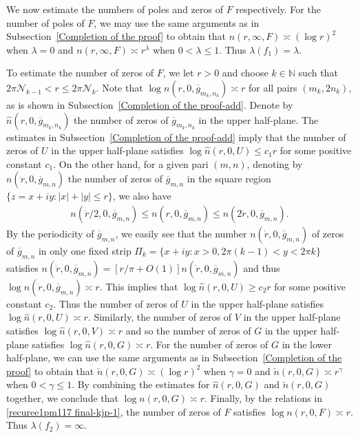 \documentclass[12pt]{amsart}
\numberwithin{equation}{section}
\begin{document}
We now estimate the numbers of poles and zeros of $F$ respectively. For the number of poles of $F$, we may use the same arguments as in Subsection~\ref{Completion of the proof} to obtain that $n(r,\infty,F)\asymp (\log r)^2$ when $\lambda=0$ and $n(r,\infty,F)\asymp r^{\lambda}$ when $0<\lambda\leq 1$. Thus $\lambda(f_1)=\lambda$.

To estimate the number of zeros of $F$, we let $r>0$ and choose $k\in \mathbb{N}$ such that $2\pi\mathcal{N}_{k-1}<r\leq 2\pi \mathcal{N}_k$. Note that $\log n(r,0,\overline{g}_{m_k,n_k})\asymp r$ for all pairs $(m_k,2n_k)$, as is shown in Subsection~\ref{Completion of the proof-add}. Denote by $\hat{n}(r,0,\overline{g}_{m_k,n_k})$ the number of zeros of $\overline{g}_{m_k,n_k}$ in the upper half-plane. The estimates in Subsection~\ref{Completion of the proof-add} imply that the number of zeros of $U$ in the upper half-plane satisfies $\log \hat{n}(r,0,U)\leq c_1r$ for some positive constant $c_1$. On the other hand, for a given pari $(m,n)$, denoting by $n(\ddot{r},0,\overline{g}_{m,n})$ the number of zeros of $\overline{g}_{m,n}$ in the square region $\{z=x+iy:|x|+|y|\leq r\}$, we also have
\begin{equation*}
\begin{split}
n(\ddot{r}/2,0,\overline{g}_{m,n})\leq n(r,0,\overline{g}_{m,n})\leq n(2\ddot{r},0,\overline{g}_{m,n}).
\end{split}
\end{equation*}
By the periodicity of $\overline{g}_{m,n}$, we easily see that the number $n(\dot{r},0,\overline{g}_{m,n})$ of zeros of $\overline{g}_{m,n}$ in only one fixed strip $\Pi_k=\{x+iy: x>0, 2\pi(k-1)<y<2\pi k\}$ satisfies $n(\ddot{r},0,\overline{g}_{m,n})=[r/\pi+O(1)]n(\dot{r},0,\overline{g}_{m,n})$ and thus $\log n(\dot{r},0,\overline{g}_{m,n})\asymp r$. This implies that $\log \hat{n}(r,0,U)\geq c_2r$ for some positive constant $c_2$. Thus the number of zeros of $U$ in the upper half-plane satisfies $\log\hat{n}(r,0,U)\asymp r$. Similarly, the number of zeros of $V$ in the upper half-plane satisfies $\log\hat{n}(r,0,V)\asymp r$ and so the number of zeros of $G$ in the upper half-plane satisfies $\log\hat{n}(r,0,G)\asymp r$. For the number of zeros of $G$ in the lower half-plane, we can use the same arguments as in Subsection~\ref{Completion of the proof} to obtain that $\check{n}(r,0,G)\asymp (\log r)^2$ when $\gamma=0$ and $\check{n}(r,0,G)\asymp r^{\gamma}$ when $0<\gamma\leq 1$. By combining the estimates for $\hat{n}(r,0,G)$ and $\check{n}(r,0,G)$ together, we conclude that $\log n(r,0,G)\asymp r$. Finally, by the relations in \eqref{recuree1pm117 final-kjp-1}, the number of zeros of $F$ satisfies $\log n(r,0,F)\asymp r$. Thus $\lambda(f_2)=\infty$.
\end{document}
